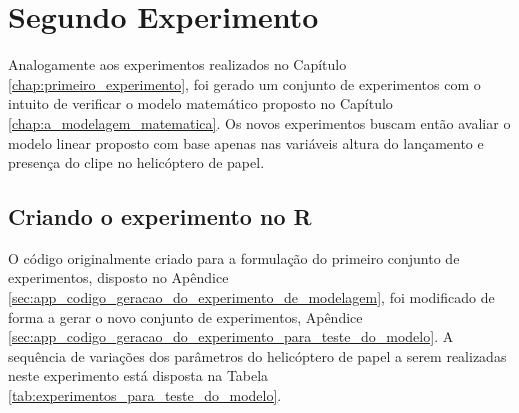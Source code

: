 \chapter{Segundo Experimento}
\label{chap:segundo_experimento}


Analogamente aos experimentos realizados no Capítulo \ref{chap:primeiro_experimento}, foi gerado um conjunto de experimentos com o intuito de verificar o modelo matemático proposto no Capítulo \ref{chap:a_modelagem_matematica}. Os novos experimentos buscam então avaliar o modelo linear proposto com base apenas nas variáveis altura do lançamento e presença do clipe no helicóptero de papel.

\section{Criando o experimento no R}
\label{sec:segundo_experimento_criando o experimento_no_R}


O código originalmente criado para a formulação do primeiro conjunto de experimentos, disposto no Apêndice \ref{sec:app_codigo_geracao_do_experimento_de_modelagem}, foi modificado de forma a gerar o novo conjunto de experimentos, Apêndice \ref{sec:app_codigo_geracao_do_experimento_para_teste_do_modelo}. A sequência de variações dos parâmetros do helicóptero de papel a serem realizadas neste experimento está disposta na Tabela \ref{tab:experimentos_para_teste_do_modelo}.

\begin{table}[H]
  \centering
  \caption{Experimentos para teste do modelo.}
  \label{tab:experimentos_para_teste_do_modelo}
\end{table}

